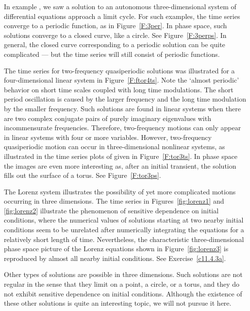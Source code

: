 In example , we saw a solution to an autonomous three-dimensional 
system of differential equations approach a limit cycle.  For such 
examples, the time series converge to a periodic function, as in 
Figure~\ref{F:3per}.  In phase space, such solutions converge to a closed 
curve, like a circle.  See Figure~\ref{F:3perps}.   In general, the closed 
curve corresponding to a periodic solution can be quite complicated --- but 
the time series will still consist of periodic functions.

The time series for two-frequency quasiperiodic solutions was illustrated for
a four-dimensional linear system in Figure~\ref{F:ftor4ts}.  Note the `almost 
periodic' behavior on short time scales coupled with long time modulations.
The short period oscillation is caused by the larger frequency and the long 
time modulation by the smaller frequency.  Such solutions are found in linear 
systems when there are two complex conjugate pairs of purely imaginary 
eigenvalues with incommensurate frequencies.  Therefore, two-frequency 
motions can only appear in linear systems with four or more variables.  
However, two-frequency quasiperiodic motion can occur in three-dimensional 
nonlinear systems, as illustrated in the time series plots of  
given in Figure~\ref{F:tor3ts}.  In phase space the images are even more 
interesting as, after an initial transient, the solution fills out the 
surface of a torus.  See Figure~\ref{F:tor3ps}.

The Lorenz system  illustrates the possibility of yet more 
complicated motions occurring in three dimensions.  The time series in 
Figures~\ref{fig:lorenz1} and \ref{fig:lorenz2} illustrate the phenomenon of 
sensitive dependence on initial conditions, where the numerical values of 
solutions starting at two nearby initial conditions seem to be unrelated 
after numerically integrating the equations for a relatively short length of 
time.  Nevertheless, the characteristic three-dimensional phase space picture 
of the Lorenz equations shown in Figure~\ref{fig:lorenz3} is reproduced by 
almost all nearby initial conditions.  See Exercise~\ref{c11.4.3a}.
 
Other types of solutions are possible in three dimensions.  Such solutions
are not regular in the sense that they limit on a point, a circle, or a
torus, and they do not exhibit sensitive dependence on initial conditions.  
Although the existence of these other solutions is quite an interesting
topic, we will not pursue it here. 


